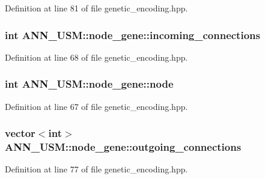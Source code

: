 Definition at line 81 of file genetic\-\_\-encoding.\-hpp.

\hypertarget{class_a_n_n___u_s_m_1_1node__gene_a7e8526e6590c4cf1ee406246d952cc8a}{
\subsubsection[{incoming\-\_\-connections}]{\setlength{\rightskip}{0pt plus 5cm}int A\-N\-N\-\_\-\-U\-S\-M\-::node\-\_\-gene\-::incoming\-\_\-connections}}\label{class_a_n_n___u_s_m_1_1node__gene_a7e8526e6590c4cf1ee406246d952cc8a}


Definition at line 68 of file genetic\-\_\-encoding.\-hpp.

\hypertarget{class_a_n_n___u_s_m_1_1node__gene_a426387db0b455d5e07debcf1ce186100}{
\subsubsection[{node}]{\setlength{\rightskip}{0pt plus 5cm}int A\-N\-N\-\_\-\-U\-S\-M\-::node\-\_\-gene\-::node}}\label{class_a_n_n___u_s_m_1_1node__gene_a426387db0b455d5e07debcf1ce186100}


Definition at line 67 of file genetic\-\_\-encoding.\-hpp.

\hypertarget{class_a_n_n___u_s_m_1_1node__gene_aa368c019e28b51deba3d01ecef5e85de}{
\subsubsection[{outgoing\-\_\-connections}]{\setlength{\rightskip}{0pt plus 5cm}vector$<$int$>$ A\-N\-N\-\_\-\-U\-S\-M\-::node\-\_\-gene\-::outgoing\-\_\-connections}}\label{class_a_n_n___u_s_m_1_1node__gene_aa368c019e28b51deba3d01ecef5e85de}


Definition at line 77 of file genetic\-\_\-encoding.\-hpp.

